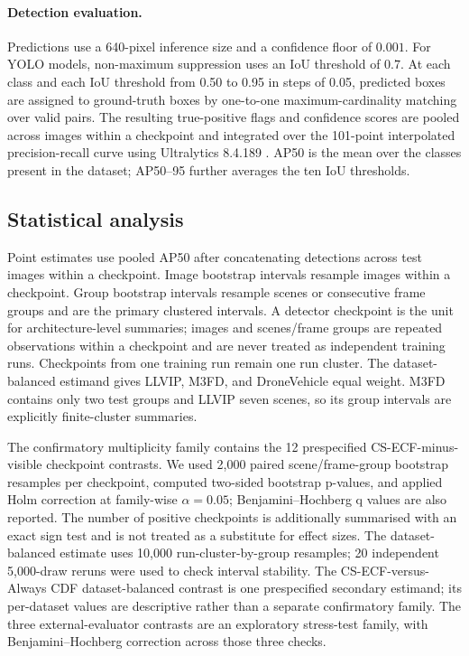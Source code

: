 \documentclass[preprint,11pt]{elsarticle}
\begin{document}
\paragraph{Detection evaluation.}
Predictions use a 640-pixel inference size and a confidence floor of
\(0.001\). For YOLO models, non-maximum suppression uses an IoU threshold of
\(0.7\). At each class and each IoU threshold from 0.50 to 0.95 in steps of
0.05, predicted boxes are assigned to ground-truth boxes by one-to-one
maximum-cardinality matching over valid pairs. The resulting true-positive
flags and confidence scores are pooled across images within a checkpoint and
integrated over the 101-point interpolated precision-recall curve using
Ultralytics 8.4.189 \cite{jocher2026ultralytics}. AP50 is the mean over the
classes present in the dataset; AP50--95 further averages the ten IoU
thresholds.

\subsection{Statistical analysis}

Point estimates use pooled AP50 after concatenating detections across test
images within a checkpoint. Image bootstrap intervals resample images within a
checkpoint. Group bootstrap intervals resample scenes or consecutive frame
groups and are the primary clustered intervals. A detector checkpoint is the
unit for architecture-level summaries; images and scenes/frame groups are
repeated observations within a checkpoint and are never treated as independent
training runs. Checkpoints from one training run remain one run cluster.
The dataset-balanced estimand gives LLVIP, M3FD, and DroneVehicle equal weight.
M3FD contains only two test groups and LLVIP seven scenes, so its group
intervals are explicitly finite-cluster summaries.

The confirmatory multiplicity family contains the 12 prespecified
CS-ECF-minus-visible checkpoint contrasts. We used 2,000 paired
scene/frame-group bootstrap resamples per checkpoint, computed two-sided
bootstrap p-values, and applied Holm correction at family-wise
\(\alpha=0.05\); Benjamini--Hochberg q values are also reported. The number of
positive checkpoints is additionally summarised with an exact sign test and is
not treated as a substitute for effect sizes. The dataset-balanced estimate
uses 10,000 run-cluster-by-group resamples; 20 independent 5,000-draw reruns
were used to check interval stability. The CS-ECF-versus-Always CDF
dataset-balanced contrast is one prespecified secondary estimand; its
per-dataset values are descriptive rather than a separate confirmatory family.
The three external-evaluator contrasts are an exploratory stress-test family,
with Benjamini--Hochberg correction across those three checks.
\end{document}
